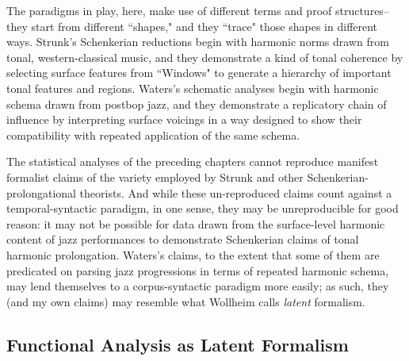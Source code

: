 The paradigms in play, here, make use of different terms and proof structures-- they start from different ``shapes," and they ``trace" those shapes in different ways.  Strunk's Schenkerian reductions begin with harmonic norms drawn from tonal, western-classical music, and they demonstrate a kind of tonal coherence by selecting surface features from ``Windows" to generate a hierarchy of important tonal features and regions.  Waters's schematic analyses begin with harmonic schema drawn from postbop jazz, and they demonstrate a replicatory chain of influence by interpreting surface voicings in a way designed to show their compatibility with repeated application of the same schema.

The statistical analyses of the preceding chapters cannot reproduce manifest formalist claims of the variety employed by Strunk and other Schenkerian-prolongational theorists.  And while these un-reproduced claims count against a temporal-syntactic paradigm, in one sense, they may be unreproducible for good reason: it may not be possible for data drawn from the surface-level harmonic content of jazz performances to demonstrate Schenkerian claims of tonal harmonic prolongation.  Waters's claims, to the extent that some of them are predicated on parsing jazz progressions in terms of repeated harmonic schema, may lend themselves to a corpus-syntactic paradigm more easily; as such, they (and my own claims) may resemble what Wollheim calls \emph{latent} formalism.


\subsection{Functional Analysis as Latent Formalism}

